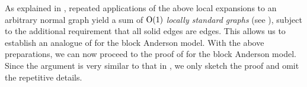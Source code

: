 As explained in \cite[Appendix B]{yang2024Del}, repeated applications of the above local expansions to an arbitrary normal graph yield a sum of $\operatorname{O}(1)$ \emph{locally standard graphs} (see ), subject to the additional requirement that all solid edges are \smash{$\Gc$} edges. This allows us to establish an analogue of  for the block Anderson model. 
With the above preparations, we can now proceed to the proof of  for the block Anderson model.
Since the argument is very similar to that in , we only sketch the proof and omit the repetitive details.



